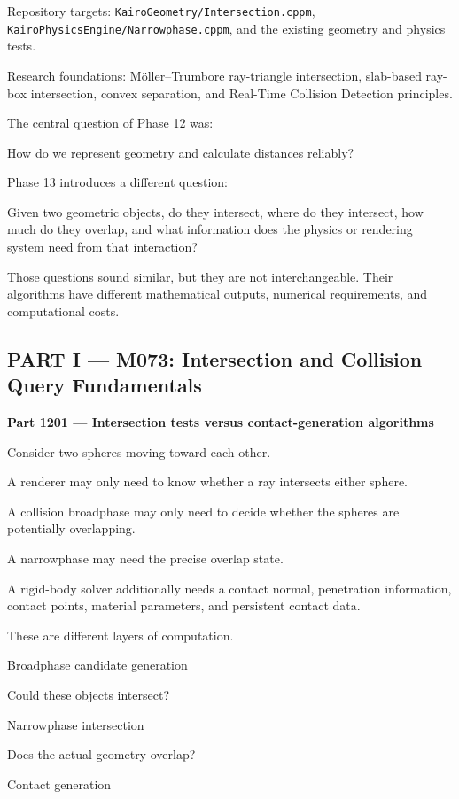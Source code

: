 Repository targets: \texttt{KairoGeometry/Intersection.cppm}, \texttt{KairoPhysicsEngine/Narrowphase.cppm}, and the existing geometry and physics tests.

Research foundations: Möller--Trumbore ray-triangle intersection, slab-based ray-box intersection, convex separation, and Real-Time Collision Detection principles.

The central question of Phase 12 was:

How do we represent geometry and calculate distances reliably?

Phase 13 introduces a different question:

Given two geometric objects, do they intersect, where do they intersect, how much do they overlap, and what information does the physics or rendering system need from that interaction?

Those questions sound similar, but they are not interchangeable. Their algorithms have different mathematical outputs, numerical requirements, and computational costs.

\subsection{PART I --- M073: Intersection and Collision Query Fundamentals}\label{04-visual-computing-ii-ch023-part-i-m073-intersection-and-collision-query-fundamentals}

\textbf{Part 1201 --- Intersection tests versus contact-generation algorithms}

Consider two spheres moving toward each other.

A renderer may only need to know whether a ray intersects either sphere.

A collision broadphase may only need to decide whether the spheres are potentially overlapping.

A narrowphase may need the precise overlap state.

A rigid-body solver additionally needs a contact normal, penetration information, contact points, material parameters, and persistent contact data.

These are different layers of computation.

Broadphase candidate generation

Could these objects intersect?

Narrowphase intersection

Does the actual geometry overlap?

Contact generation


